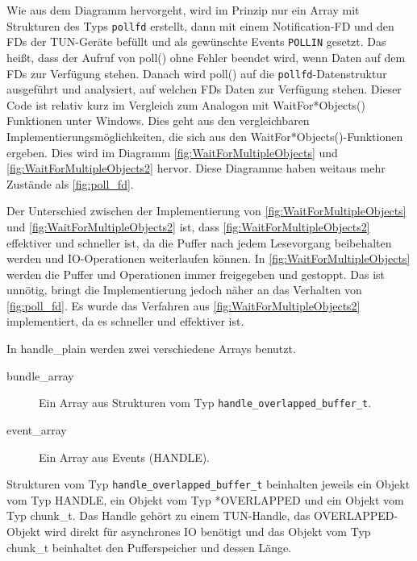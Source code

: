 {Wie aus dem Diagramm hervorgeht, wird im Prinzip nur ein Array mit Strukturen des Typs
\texttt{pollfd} erstellt, dann mit einem Notification-\ac{FD} und den \acp{FD} der TUN-Geräte befüllt
und als gewünschte Events \texttt{POLLIN} gesetzt. Das heißt, dass der Aufruf von poll() ohne
Fehler beendet wird, wenn Daten auf dem \acp{FD} zur Verfügung stehen.
Danach wird poll() auf die \texttt{pollfd}-Datenstruktur ausgeführt und analysiert,
auf welchen \acp{FD} Daten zur Verfügung stehen. Dieser Code ist relativ kurz im
Vergleich zum Analogon mit WaitFor*Objects() Funktionen unter Windows.
Dies geht aus den vergleichbaren Implementierungsmöglichkeiten, die sich aus den
WaitFor*Objects()-Funktionen ergeben. Dies wird im Diagramm \autoref{fig:WaitForMultipleObjects}
und \autoref{fig:WaitForMultipleObjects2} hervor. Diese Diagramme haben weitaus
mehr Zustände als \autoref{fig:poll_fd}.

Der Unterschied zwischen der Implementierung von \autoref{fig:WaitForMultipleObjects}
und \autoref{fig:WaitForMultipleObjects2} ist, dass \autoref{fig:WaitForMultipleObjects2}
effektiver und schneller ist, da die Puffer nach jedem Lesevorgang beibehalten werden
und IO-Operationen weiterlaufen können.
In \autoref{fig:WaitForMultipleObjects} werden die Puffer und Operationen
immer freigegeben und gestoppt. Das ist unnötig, bringt die Implementierung
jedoch näher an das Verhalten von \autoref{fig:poll_fd}.
Es wurde das Verfahren aus \autoref{fig:WaitForMultipleObjects2} implementiert,
da es schneller und effektiver ist.

In handle\_plain werden zwei verschiedene Arrays benutzt.
\begin{description}
\item[bundle\_array] Ein Array aus Strukturen vom Typ \texttt{handle\_overlapped\_buffer\_t}. 
\item[event\_array] Ein Array aus Events (HANDLE).
\end{description}

Strukturen vom Typ \texttt{handle\_overlapped\_buffer\_t} beinhalten jeweils ein Objekt
vom Typ HANDLE, ein Objekt vom Typ *OVERLAPPED und ein Objekt vom Typ chunk\_t.
Das Handle gehört zu einem TUN-Handle, das OVERLAPPED-Objekt wird direkt für asynchrones
IO benötigt und das Objekt vom Typ chunk\_t beinhaltet den Pufferspeicher und dessen Länge.

}
